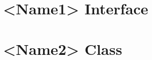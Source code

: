 \documentclass[]{article}
\begin{document}
\section{<Name1> Interface}

 








\section{<Name2> Class}




 

\end{document}
